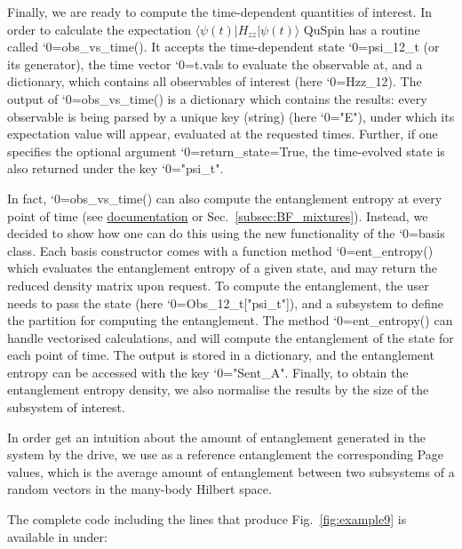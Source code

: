 \documentclass{SciPost}
\newcommand\0{\scalebox{-1}[1]{0}}
\let\svttfamily\ttfamily
\renewcommand\ttfamily{\svttfamily\catcode`0=\active }
\renewcommand\texttt{\bgroup\ttfamily\texttthelp}
\def\texttthelp#1{#1\egroup}
\newcommand{\Spincode}{example9.py}
\begin{document}

Finally, we are ready to compute the time-dependent quantities of interest. In order to calculate the expectation $\langle\psi(t)|H_{zz}|\psi(t)\rangle$ QuSpin has a routine called \texttt{obs\_vs\_time()}. It accepts the time-dependent state \texttt{psi\_12\_t} (or its generator), the time vector \texttt{t.vals} to evaluate the observable at, and a dictionary, which contains all observables of interest (here \texttt{Hzz\_12}). The output of \texttt{obs\_vs\_time()} is a dictionary which contains the results: every observable is being parsed by a unique key (string) (here \texttt{"E"}), under which its expectation value will appear, evaluated at the requested times. Further, if one specifies the optional argument \texttt{return\_state=True}, the time-evolved state is also returned under the key \texttt{"psi\_t"}. 

In fact, \texttt{obs\_vs\_time()} can also compute the entanglement entropy at every point of time (see \href{http://weinbe58.github.io/QuSpin/index.html}{documentation} or Sec.~\ref{subsec:BF_mixtures}). Instead, we decided to show how one can do this using the new functionality of the \texttt{basis} class. Each basis constructor comes with a function method \texttt{ent\_entropy()} which evaluates the entanglement entropy of a given state, and may return the reduced density matrix upon request. To compute the entanglement, the user needs to pass the state (here \texttt{Obs\_12\_t["psi\_t"]}), and a subsystem to define the partition for computing the entanglement. The method \texttt{ent\_entropy()} can handle vectorised calculations, and will compute the entanglement of the state for each point of time. The output is stored in a dictionary, and the entanglement entropy can be accessed with the key \texttt{"Sent\_A"}. Finally, to obtain the entanglement entropy density, we also normalise the results by the size of the subsystem of interest.

In order get an intuition about the amount of entanglement generated in the system by the drive, we use as a reference entanglement the corresponding Page values, which is the average amount of entanglement between two subsystems of a random vectors in the many-body Hilbert space. 


The complete code including the lines that produce Fig.~\ref{fig:example9} is available in under:\\
\end{document}
